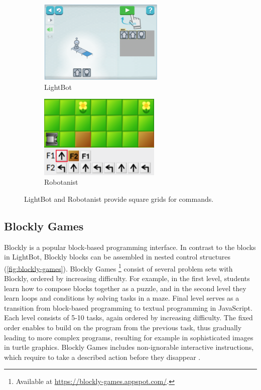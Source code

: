 

\begin{figure}[htb]
\centering
\begin{subfigure}[t]{0.5\textwidth}
\centering
\includegraphics[height=4cm]{img/lightbot-instruction}
\caption{LightBot}
\label{fig:lightbot}
\end{subfigure}%
\begin{subfigure}[t]{0.5\textwidth}
\centering
\includegraphics[height=4cm]{img/robotanist}
\caption{Robotanist}
\label{fig:robotanist}
\end{subfigure}
\caption{LightBot and Robotanist provide square grids for commands.}
\label{fig:lightbot-robotanist}
\end{figure}



\subsection{Blockly Games}
\label{sec:blockly-games}
Blockly is a popular block-based programming interface.
In contrast to the blocks in LightBot,
Blockly blocks can be assembled in nested control structures
(\cref{fig:blockly-games}).
Blockly Games%
\footnote{Available at \url{https://blockly-games.appspot.com/}.}
consist of several problem sets with Blockly, ordered by increasing difficulty.
For example, in the first level, students learn how to compose blocks together
as a puzzle, and in the second level they learn loops and conditions by solving
tasks in a maze. Final level serves as a transition from block-based
programming to textual programming in JavaScript.
Each level consists of 5-10 tasks, again ordered by increasing difficulty. %
The fixed order enables to build on the program from the previous task,
thus gradually leading to more complex programs,
resulting for example in sophisticated images in turtle graphics.
Blockly Games includes non-ignorable interactive instructions,
which require to take a described action before they disappear
\cite{blockly-10-things}.

